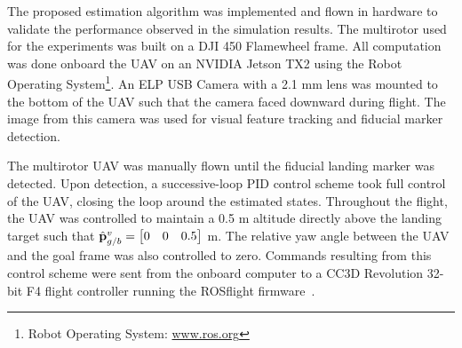 
The proposed estimation algorithm was implemented and flown in
hardware to validate the performance observed in the simulation
results. The multirotor used for the experiments was built on a DJI 450 Flamewheel
frame. All computation was done onboard the UAV on an NVIDIA Jetson TX2 using
the Robot Operating System\footnote{Robot Operating System:
\url{www.ros.org}}.
An ELP
USB Camera with a 2.1 mm lens was mounted to the bottom of the UAV such that the
camera faced downward during flight. The image from this camera was used for visual
feature tracking and fiducial marker detection.

The multirotor UAV was manually flown until the fiducial landing marker was
detected.
Upon detection, a successive-loop PID control scheme took full control of the
UAV, closing the loop around the
estimated states. Throughout the flight, the UAV was controlled to maintain a
0.5 m altitude directly above the landing target such that $\hat{\boldsymbol{\mathrm{p}}}_{g/b}^v =
\begin{bmatrix} 0 & 0 & 0.5 \end{bmatrix}$ m.
The relative yaw
angle between the UAV and the goal frame was also controlled to zero.
Commands resulting from this control scheme were sent from
the onboard computer to a CC3D Revolution 32-bit F4 flight controller running
the ROSflight firmware~\cite{jackson2016rosflight}.

